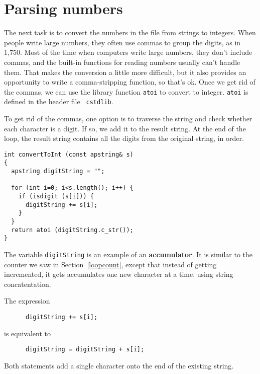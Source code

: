 \section{Parsing numbers}

The next task is to convert the numbers in the file from strings to
integers.  When people write large numbers, they often use commas to
group the digits, as in 1,750.  Most of the time when computers write
large numbers, they don't include commas, and the built-in functions
for reading numbers usually can't handle them.  That makes the
conversion a little more difficult, but it also provides an
opportunity to write a comma-stripping function, so that's ok.  Once
we get rid of the commas, we can use the library function {\tt atoi}
to convert to integer.  {\tt atoi} is defined in the header file {\tt
cstdlib}.


To get rid of the commas, one option is to traverse the string and
check whether each character is a digit.  If so, we add it to the
result string.  At the end of the loop, the result string contains all
the digits from the original string, in order.

\begin{verbatim}
int convertToInt (const apstring& s)
{
  apstring digitString = "";

  for (int i=0; i<s.length(); i++) {
    if (isdigit (s[i])) {
      digitString += s[i];
    }
  }
  return atoi (digitString.c_str());
}
\end{verbatim}
%
The variable {\tt digitString} is an example of an {\bf accumulator}.  It is
similar to the counter we saw in Section~\ref{loopcount},
except that instead of getting incremented, it gets accumulates
one new character at a time, using string concatentation.

The expression

\begin{verbatim}
      digitString += s[i];
\end{verbatim}
%
is equivalent to

\begin{verbatim}
      digitString = digitString + s[i];
\end{verbatim}
%
Both statements add a single character onto the end of the existing
string.


